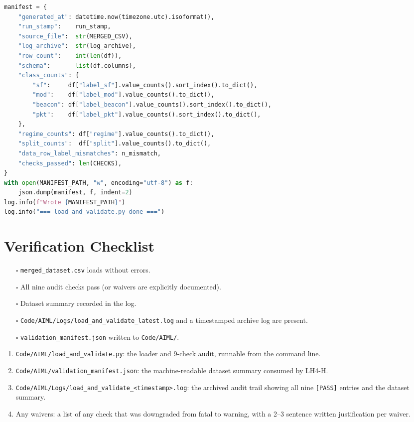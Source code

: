 \documentclass[11pt,letterpaper]{article}
\begin{document}
\begin{lstlisting}[language=Python]
manifest = {
    "generated_at": datetime.now(timezone.utc).isoformat(),
    "run_stamp":    run_stamp,
    "source_file":  str(MERGED_CSV),
    "log_archive":  str(log_archive),
    "row_count":    int(len(df)),
    "schema":       list(df.columns),
    "class_counts": {
        "sf":     df["label_sf"].value_counts().sort_index().to_dict(),
        "mod":    df["label_mod"].value_counts().to_dict(),
        "beacon": df["label_beacon"].value_counts().sort_index().to_dict(),
        "pkt":    df["label_pkt"].value_counts().sort_index().to_dict(),
    },
    "regime_counts": df["regime"].value_counts().to_dict(),
    "split_counts":  df["split"].value_counts().to_dict(),
    "data_row_label_mismatches": n_mismatch,
    "checks_passed": len(CHECKS),
}
with open(MANIFEST_PATH, "w", encoding="utf-8") as f:
    json.dump(manifest, f, indent=2)
log.info(f"Wrote {MANIFEST_PATH}")
log.info("=== load_and_validate.py done ===")
\end{lstlisting}

\section{Verification Checklist}
\begin{itemize}[leftmargin=2em]
	\item[$\square$] \texttt{merged\_dataset.csv} loads without errors.
	\item[$\square$] All nine audit checks pass (or waivers are explicitly documented).
	\item[$\square$] Dataset summary recorded in the log.
	\item[$\square$] \texttt{Code/AIML/Logs/load\_and\_validate\_latest.log} and a timestamped archive log are present.
	\item[$\square$] \texttt{validation\_manifest.json} written to \texttt{Code/AIML/}.
\end{itemize}

\begin{tcolorbox}[deliverable={Lab Handout 4-A Deliverable}]
	\begin{enumerate}[leftmargin=1.2em]
		\item \texttt{Code/AIML/load\_and\_validate.py}: the loader and 9-check audit, runnable from the command line.
		\item \texttt{Code/AIML/validation\_manifest.json}: the machine-readable dataset summary consumed by LH4-H.
		\item \texttt{Code/AIML/Logs/load\_and\_validate\_<timestamp>.log}: the archived audit trail showing all nine \texttt{[PASS]} entries and the dataset summary.
		\item Any waivers: a list of any check that was downgraded from fatal to warning, with a 2--3 sentence written justification per waiver.
	\end{enumerate}
\end{tcolorbox}

\printhandoutglossary
\end{document}
